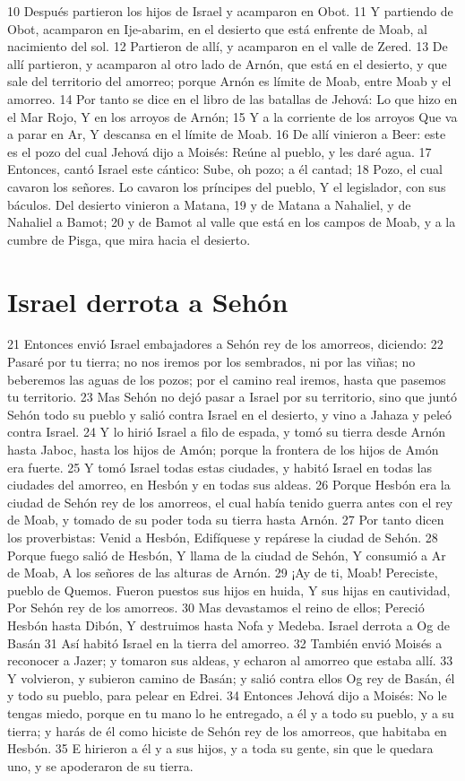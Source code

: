 10 Después partieron los hijos de Israel y acamparon en Obot.
11 Y partiendo de Obot, acamparon en Ije-abarim, en el desierto que está enfrente de Moab, al nacimiento del sol.
12 Partieron de allí, y acamparon en el valle de Zered.
13 De allí partieron, y acamparon al otro lado de Arnón, que está en el desierto, y que sale del territorio del amorreo; porque Arnón es límite de Moab, entre Moab y el amorreo.
14 Por tanto se dice en el libro de las batallas de Jehová:
Lo que hizo en el Mar Rojo,
Y en los arroyos de Arnón;
15 Y a la corriente de los arroyos
Que va a parar en Ar,
Y descansa en el límite de Moab. 
16 De allí vinieron a Beer: este es el pozo del cual Jehová dijo a Moisés: Reúne al pueblo, y les daré agua.
17 Entonces, cantó Israel este cántico:
Sube, oh pozo; a él cantad; 
18 Pozo, el cual cavaron los señores.
Lo cavaron los príncipes del pueblo,
Y el legislador, con sus báculos.
Del desierto vinieron a Matana, 
19 y de Matana a Nahaliel, y de Nahaliel a Bamot;
20 y de Bamot al valle que está en los campos de Moab, y a la cumbre de Pisga, que mira hacia el desierto.

\section*{Israel derrota a Sehón }

21 Entonces envió Israel embajadores a Sehón rey de los amorreos, diciendo:
22 Pasaré por tu tierra; no nos iremos por los sembrados, ni por las viñas; no beberemos las aguas de los pozos; por el camino real iremos, hasta que pasemos tu territorio.
23 Mas Sehón no dejó pasar a Israel por su territorio, sino que juntó Sehón todo su pueblo y salió contra Israel en el desierto, y vino a Jahaza y peleó contra Israel.
24 Y lo hirió Israel a filo de espada, y tomó su tierra desde Arnón hasta Jaboc, hasta los hijos de Amón; porque la frontera de los hijos de Amón era fuerte.
25 Y tomó Israel todas estas ciudades, y habitó Israel en todas las ciudades del amorreo, en Hesbón y en todas sus aldeas.
26 Porque Hesbón era la ciudad de Sehón rey de los amorreos, el cual había tenido guerra antes con el rey de Moab, y tomado de su poder toda su tierra hasta Arnón.
27 Por tanto dicen los proverbistas:
Venid a Hesbón,
Edifíquese y repárese la ciudad de Sehón. 
28 Porque fuego salió de Hesbón,
Y llama de la ciudad de Sehón,
Y consumió a Ar de Moab,
A los señores de las alturas de Arnón.
29 ¡Ay de ti, Moab!
Pereciste, pueblo de Quemos.
Fueron puestos sus hijos en huida,
Y sus hijas en cautividad,
Por Sehón rey de los amorreos.
30 Mas devastamos el reino de ellos;
Pereció Hesbón hasta Dibón,
Y destruimos hasta Nofa y Medeba.
Israel derrota a Og de Basán 
31 Así habitó Israel en la tierra del amorreo.
32 También envió Moisés a reconocer a Jazer; y tomaron sus aldeas, y echaron al amorreo que estaba allí.
33 Y volvieron, y subieron camino de Basán; y salió contra ellos Og rey de Basán, él y todo su pueblo, para pelear en Edrei.
34 Entonces Jehová dijo a Moisés: No le tengas miedo, porque en tu mano lo he entregado, a él y a todo su pueblo, y a su tierra; y harás de él como hiciste de Sehón rey de los amorreos, que habitaba en Hesbón.
35 E hirieron a él y a sus hijos, y a toda su gente, sin que le quedara uno, y se apoderaron de su tierra.

